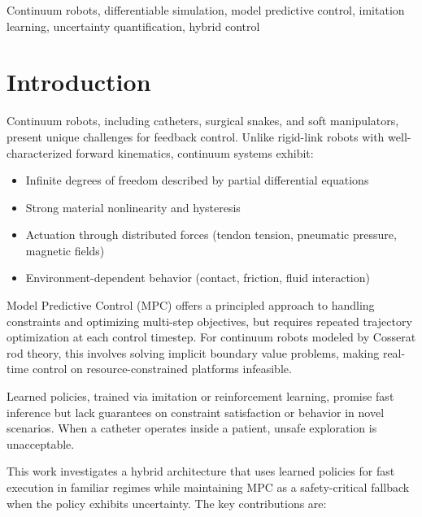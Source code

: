 \documentclass[conference]{IEEEtran}
\begin{document}
\begin{IEEEkeywords}
Continuum robots, differentiable simulation, model predictive control, imitation learning, uncertainty quantification, hybrid control
\end{IEEEkeywords}

\section{Introduction}

Continuum robots, including catheters, surgical snakes, and soft manipulators, present unique challenges for feedback control. Unlike rigid-link robots with well-characterized forward kinematics, continuum systems exhibit:
\begin{itemize}
\item Infinite degrees of freedom described by partial differential equations
\item Strong material nonlinearity and hysteresis
\item Actuation through distributed forces (tendon tension, pneumatic pressure, magnetic fields)
\item Environment-dependent behavior (contact, friction, fluid interaction)
\end{itemize}

Model Predictive Control (MPC) offers a principled approach to handling constraints and optimizing multi-step objectives, but requires repeated trajectory optimization at each control timestep. For continuum robots modeled by Cosserat rod theory, this involves solving implicit boundary value problems, making real-time control on resource-constrained platforms infeasible.

Learned policies, trained via imitation or reinforcement learning, promise fast inference but lack guarantees on constraint satisfaction or behavior in novel scenarios. When a catheter operates inside a patient, unsafe exploration is unacceptable.

This work investigates a hybrid architecture that uses learned policies for fast execution in familiar regimes while maintaining MPC as a safety-critical fallback when the policy exhibits uncertainty. The key contributions are:
\end{document}
